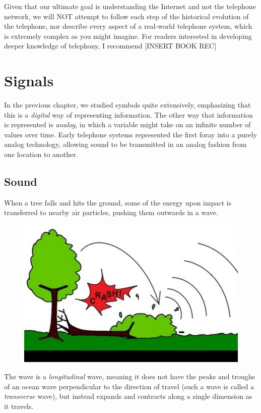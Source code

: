 \documentclass[UTF8]{book}
\begin{document}
\begin{CJK}{UTF8}{gbsn}
Given that our ultimate goal is understanding the Internet and not the telephone network, we will NOT attempt to follow each step of the historical evolution of the telephone, nor describe every aspect of a real-world telephone system, which is extremely complex as you might imagine. For readers interested in developing deeper knowledge of telephony, I recommend [INSERT BOOK REC]

\chapter{Signals}

In the previous chapter, we studied symbols quite extensively, emphasizing that this is a \emph{digital} way of representing information. The other way that information is represented is \emph{analog}, in which a variable might take on an infinite number of values over time. Early telephone systems represented the first foray into a purely analog technology, allowing sound to be transmitted in an analog fashion from one location to another.

\section{Sound}

When a tree falls and hits the ground, some of the energy upon impact is transferred to nearby air particles, pushing them outwards in a wave.

\begin{figure}[H]
\centering
\includegraphics[width=0.8\linewidth]{treefalling_edited}
\end{figure}

The wave is a \emph{longitudinal} wave, meaning it does not have the peaks and troughs of an ocean wave perpendicular to the direction of travel (such a wave is called a \emph{transverse} wave), but instead expands and contracts along a single dimension as it travels.


\end{CJK}
\end{document}
